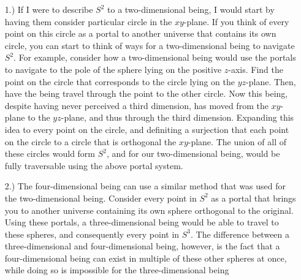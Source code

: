 \documentclass[12pt]{article}
\begin{document}
\pagestyle{fancy}
\fancyhead{}

\normalsize

\begin{itemize}
    \item[1.)] If I were to describe $S^2$ to a two-dimensional being, I would start by having them consider particular circle in the $xy$-plane. If you think of every point on this circle as a portal to another universe that contains its own circle, you can start to think of ways for a two-dimensional being to navigate $S^2$. For example, consider how a two-dimensional being would use the portals to navigate to the pole of the sphere lying on the positive $z$-axis. Find the point on the circle that corresponds to the circle lying on the $yz$-plane. Then, have the being travel through the point to the other circle. Now this being, despite having never perceived a third dimension, has moved from the $xy$-plane to the $yz$-plane, and thus through the third dimension. Expanding this idea to every point on the circle, and definiting a surjection that each point on the circle to a circle that is orthogonal the $xy$-plane. The union of all of these circles would form $S^2$, and for our two-dimensional being, would be fully traversable using the above portal system.

    \item[2.)] The four-dimensional being can use a similar method that was used for the two-dimensional being. Consider every point in $S^2$ as a portal that brings you to another universe containing its own sphere orthogonal to the original. Using these portals, a three-dimensional being would be able to travel to these spheres, and consequently every point in $S^3$. The difference between a three-dimensional and four-dimensional being, however, is the fact that a four-dimensional being can exist in multiple of these other spheres at once, while doing so is impossible for the three-dimensional being
\end{itemize}
\end{document}
